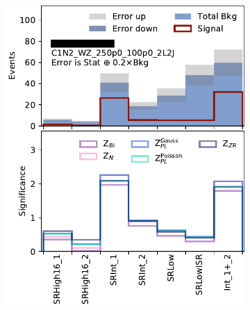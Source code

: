 \begin{figure}[tp]
\centering
\begin{subfigure}{0.495\textwidth}
\centering
\includegraphics[width=\textwidth]{figures/2ljets_disco_Int_C1N2_WZ_250p0_100p0_2L2J.png}
\caption{}
\end{subfigure}
\hfill
\begin{subfigure}{0.495\textwidth}
\centering

\end{subfigure}
\end{figure}
